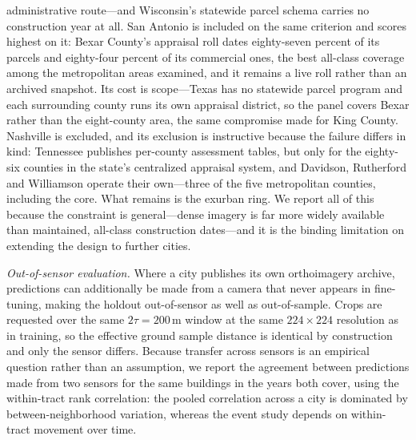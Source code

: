 \documentclass[conference]{IEEEtran}
\begin{document}
administrative route---and Wisconsin's statewide parcel schema carries no
construction year at all. San Antonio is included on the same criterion and
scores highest on it: Bexar County's appraisal roll dates eighty-seven percent of
its parcels and eighty-four percent of its commercial ones, the best all-class
coverage among the metropolitan areas examined, and it remains a live roll rather
than an archived snapshot. Its cost is scope---Texas has no statewide parcel
program and each surrounding county runs its own appraisal district, so the panel
covers Bexar rather than the eight-county area, the same compromise made for King
County. Nashville is excluded, and its
exclusion is instructive because the failure differs in kind: Tennessee publishes
per-county assessment tables, but only for the eighty-six counties in the state's
centralized appraisal system, and Davidson, Rutherford and Williamson operate
their own---three of the five metropolitan counties, including the core. What
remains is the exurban ring. We report all of this because the constraint is
general---dense imagery is far more widely available than maintained, all-class
construction dates---and it is the binding limitation on extending the design to
further cities.

\emph{Out-of-sensor evaluation.} Where a city publishes its own orthoimagery
archive, predictions can additionally be made from a camera that never appears in
fine-tuning, making the holdout out-of-sensor as well as out-of-sample. Crops are
requested over the same $2\tau = 200$\,m window at the same $224 \times 224$
resolution as in training, so the effective ground sample distance is identical by
construction and only the sensor differs. Because transfer across sensors is an
empirical question rather than an assumption, we report the agreement between
predictions made from two sensors for the same buildings in the years both cover,
using the within-tract rank correlation: the pooled correlation across a city is
dominated by between-neighborhood variation, whereas the event study depends on
within-tract movement over time.
\end{document}
